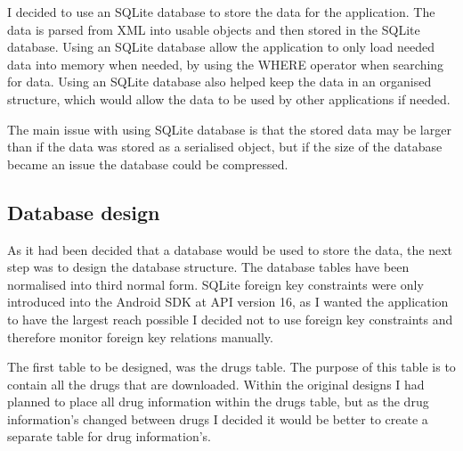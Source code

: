 I decided to use an SQLite database \cite{sqlite} to store the data for the application. The data is parsed from XML \cite{xml} into usable objects and then stored in the SQLite database. Using an SQLite database allow the application to only load needed data into memory when needed, by using the WHERE operator when searching for data. Using an SQLite database also helped keep the data in an organised structure, which would allow the data to be used by other applications if needed. 

The main issue with using SQLite database \cite{sqlite} is that the stored data may be larger than if the data was stored as a serialised object, but if the size of the database became an issue the database could be compressed.

\subsection{Database design}
As it had been decided that a database would be used to store the data, the next step was to design the database structure. The database tables have been normalised into third normal form. SQLite foreign key constraints were only introduced into the Android SDK \cite{android_sdk} at API version 16, as I wanted the application to have the largest reach possible I decided not to use foreign key constraints and therefore monitor foreign key relations manually. 

The first table to be designed, was the drugs table. The purpose of this table is to contain all the drugs that are downloaded. Within the original designs I had planned to place all drug information within the drugs table, but as the drug information's changed between drugs I decided it would be better to create a separate table for drug information's.

